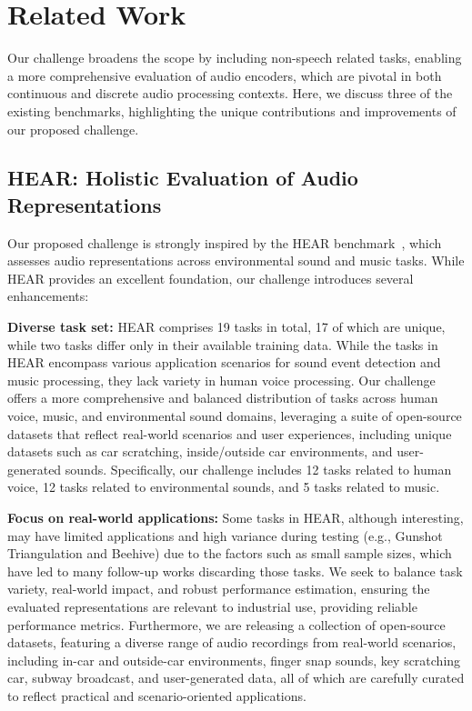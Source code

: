\documentclass{article}
\begin{document}

   

\appendix
\appendixpage
\addappheadtotoc


\section{Related Work}

Our challenge broadens the scope by including non-speech related tasks, enabling a more comprehensive evaluation of audio encoders, which are pivotal in both continuous and discrete audio processing contexts.
Here, we discuss three of the existing benchmarks, highlighting the unique contributions and improvements of our proposed challenge.

\subsection{HEAR: Holistic Evaluation of Audio Representations}
Our proposed challenge is strongly inspired by the HEAR benchmark~\cite{turian2022hear}, which assesses audio representations across environmental sound and music tasks.
While HEAR provides an excellent foundation, our challenge introduces several enhancements:

\textbf{Diverse task set:}  HEAR comprises 19 tasks in total, 17 of which are unique, while two tasks differ only in their available training data.
While the tasks in HEAR encompass various application scenarios for sound event detection and music processing, they lack variety in human voice processing.
Our challenge offers a more comprehensive and balanced distribution of tasks across human voice, music, and environmental sound domains,
leveraging a suite of open-source datasets that reflect real-world scenarios and user experiences,
including unique datasets such as car scratching, inside/outside car environments, and user-generated sounds.
Specifically, our challenge includes 12 tasks related to human voice, 12 tasks related to environmental sounds, and 5 tasks related to music.

\textbf{Focus on real-world applications:}
Some tasks in HEAR, although interesting, may have limited applications and high variance during testing (e.g., Gunshot Triangulation and Beehive) due to the factors such as small sample sizes, which have led to many follow-up works discarding those tasks.
We seek to balance task variety, real-world impact, and robust performance estimation, ensuring the evaluated representations are relevant to industrial use, providing reliable performance metrics.
Furthermore, we are releasing a collection of open-source datasets,
featuring a diverse range of audio recordings from real-world scenarios,
including in-car and outside-car environments, finger snap sounds, key scratching car, subway broadcast, and user-generated data,
all of which are carefully curated to reflect practical and scenario-oriented applications.
\end{document}
